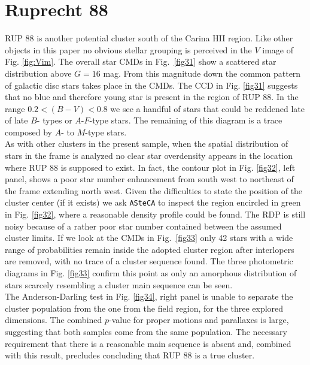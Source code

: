 \documentclass[draft]{aa}
\begin{document}
\section{Ruprecht 88}

RUP 88 is another potential cluster south of the Carina HII region. Like
other objects in this paper no obvious stellar grouping is perceived in the $V$
image of Fig. \ref{fig:Vim}. The overall star CMDs in Fig.~\ref{fig31} show a
scattered star distribution above $G=16$ mag. From this magnitude down the
common pattern of galactic disc stars takes place in the CMDs. The CCD in Fig.
\ref{fig31} suggests that no blue and therefore young star is present in the
region of RUP 88. In the range $0.2<(B-V)<0.8$ we see a handful of stars that
could be reddened late of late $B$- types or $A$-$F$-type stars. The remaining of
this diagram is a trace composed by $A$- to $M$-type stars.\\

As with other clusters in the present sample, when the spatial distribution
of stars in the frame is analyzed no clear star overdensity
appears in the location where RUP 88 is supposed to exist. In fact, the
contour plot in Fig. \ref{fig32}, left panel, shows a poor star number
enhancement from south west to northeast of the frame extending north west.
Given the difficulties to state the position of the cluster center (if it
exists) we ask \texttt{ASteCA} to inspect the region encircled in green in Fig.
\ref{fig32}, where a reasonable density profile could be found. The
RDP is still noisy because of a rather poor star number contained between the
assumed cluster limits.
If we look at the CMDs in Fig.~\ref{fig33} only 42 stars with a wide
range of probabilities remain inside the adopted cluster region 
after interlopers are removed, with no trace of a cluster sequence
found.
The three photometric diagrams in Fig. \ref{fig33} confirm this point as only
an amorphous distribution of stars scarcely resembling a cluster main sequence
can be seen.\\

The Anderson-Darling test in Fig. \ref{fig34}, right panel is unable to
separate the cluster population from the one from the field region, for the
three explored dimensions. The combined $p$-value for proper motions and
parallaxes is large, suggesting that both samples come from the same
population. The necessary requirement that there is a reasonable main
sequence is absent and, combined with this result, precludes
concluding that RUP 88 is a true cluster.
\end{document}
